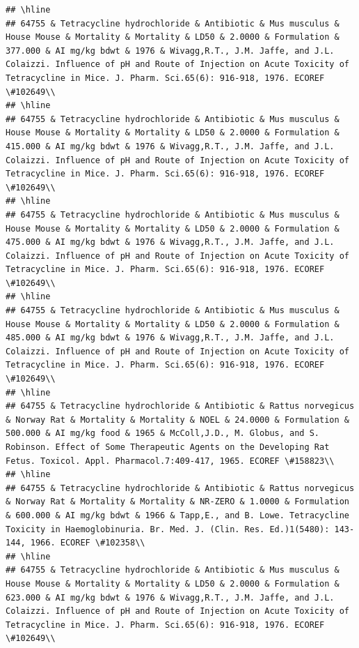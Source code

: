 \documentclass[12pt,]{article}
\begin{document}
\begin{verbatim}
## \hline
## 64755 & Tetracycline hydrochloride & Antibiotic & Mus musculus & House Mouse & Mortality & Mortality & LD50 & 2.0000 & Formulation & 377.000 & AI mg/kg bdwt & 1976 & Wivagg,R.T., J.M. Jaffe, and J.L. Colaizzi. Influence of pH and Route of Injection on Acute Toxicity of Tetracycline in Mice. J. Pharm. Sci.65(6): 916-918, 1976. ECOREF \#102649\\
## \hline
## 64755 & Tetracycline hydrochloride & Antibiotic & Mus musculus & House Mouse & Mortality & Mortality & LD50 & 2.0000 & Formulation & 415.000 & AI mg/kg bdwt & 1976 & Wivagg,R.T., J.M. Jaffe, and J.L. Colaizzi. Influence of pH and Route of Injection on Acute Toxicity of Tetracycline in Mice. J. Pharm. Sci.65(6): 916-918, 1976. ECOREF \#102649\\
## \hline
## 64755 & Tetracycline hydrochloride & Antibiotic & Mus musculus & House Mouse & Mortality & Mortality & LD50 & 2.0000 & Formulation & 475.000 & AI mg/kg bdwt & 1976 & Wivagg,R.T., J.M. Jaffe, and J.L. Colaizzi. Influence of pH and Route of Injection on Acute Toxicity of Tetracycline in Mice. J. Pharm. Sci.65(6): 916-918, 1976. ECOREF \#102649\\
## \hline
## 64755 & Tetracycline hydrochloride & Antibiotic & Mus musculus & House Mouse & Mortality & Mortality & LD50 & 2.0000 & Formulation & 485.000 & AI mg/kg bdwt & 1976 & Wivagg,R.T., J.M. Jaffe, and J.L. Colaizzi. Influence of pH and Route of Injection on Acute Toxicity of Tetracycline in Mice. J. Pharm. Sci.65(6): 916-918, 1976. ECOREF \#102649\\
## \hline
## 64755 & Tetracycline hydrochloride & Antibiotic & Rattus norvegicus & Norway Rat & Mortality & Mortality & NOEL & 24.0000 & Formulation & 500.000 & AI mg/kg food & 1965 & McColl,J.D., M. Globus, and S. Robinson. Effect of Some Therapeutic Agents on the Developing Rat Fetus. Toxicol. Appl. Pharmacol.7:409-417, 1965. ECOREF \#158823\\
## \hline
## 64755 & Tetracycline hydrochloride & Antibiotic & Rattus norvegicus & Norway Rat & Mortality & Mortality & NR-ZERO & 1.0000 & Formulation & 600.000 & AI mg/kg bdwt & 1966 & Tapp,E., and B. Lowe. Tetracycline Toxicity in Haemoglobinuria. Br. Med. J. (Clin. Res. Ed.)1(5480): 143-144, 1966. ECOREF \#102358\\
## \hline
## 64755 & Tetracycline hydrochloride & Antibiotic & Mus musculus & House Mouse & Mortality & Mortality & LD50 & 2.0000 & Formulation & 623.000 & AI mg/kg bdwt & 1976 & Wivagg,R.T., J.M. Jaffe, and J.L. Colaizzi. Influence of pH and Route of Injection on Acute Toxicity of Tetracycline in Mice. J. Pharm. Sci.65(6): 916-918, 1976. ECOREF \#102649\\

\end{verbatim}
\end{document}
